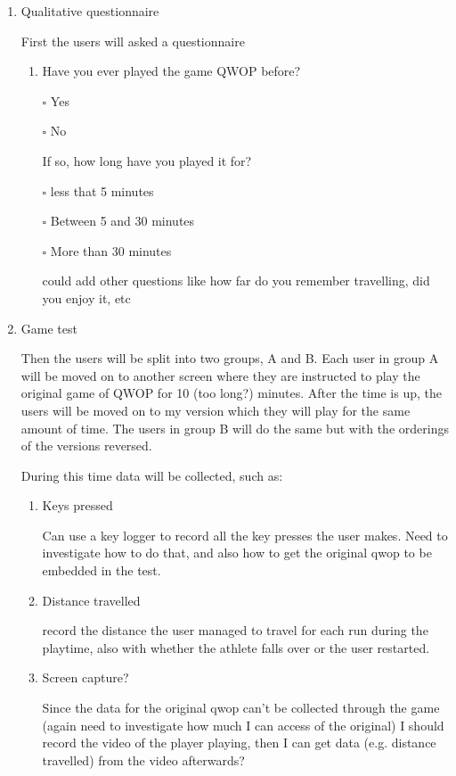\documentclass[12pt,a4paper,twoside]{article}
\begin{document}
\begin{enumerate}
	\item Qualitative questionnaire

	First the users will asked a questionnaire

	\begin{enumerate}
		\item Have you ever played the game QWOP before?

		$\square$ Yes

		$\square$ No

		If so, how long have you played it for?

		$\square$ less that 5 minutes

		$\square$ Between 5 and 30 minutes

		$\square$ More than 30 minutes

		could add other questions like how far do you remember travelling, did you enjoy it, etc

	\end{enumerate}

	\item Game test

	Then the users will be split into two groups, A and B. Each user in group A will be moved on to another screen where they are instructed to play the original game of QWOP for 10 (too long?) minutes. After the time is up, the users will be moved on to my version which they will play for the same amount of time. The users in group B will do the same but with the orderings of the versions reversed.

	During this time data will be collected, such as:

	\begin{enumerate}
		\item Keys pressed

		Can use a key logger to record all the key presses the user makes. 
		Need to investigate how to do that, and also how to get the original qwop to be embedded in the test.
		\item Distance travelled 

		record the distance the user managed to travel for each run during the playtime, also with whether the athlete falls over or the user restarted.
		\item Screen capture?

		Since the data for the original qwop can't be collected through the game (again need to investigate how much I can access of the original) I should record the video of the player playing, then I can get data (e.g. distance travelled) from the video afterwards?


\end{enumerate}
\end{enumerate}
\end{document}
